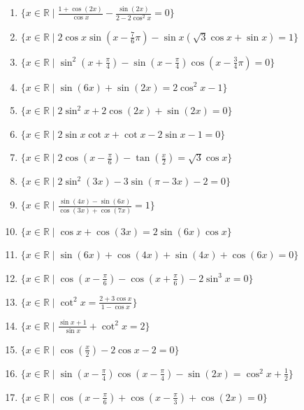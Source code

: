 \documentclass[11pt,a4paper]{article}
\begin{document}
\begin{enumerate}
\item $\displaystyle \{x \in \mathbb{R} \mid \frac{1 + \cos\left(2x\right)}{\cos x} - \frac{\sin\left(2x\right)}{2 - 2\cos^{2} x} = 0\}$
\item $\displaystyle \{x \in \mathbb{R} \mid 2\cos x \sin\left(x - \frac{7}{6}\pi\right) - \sin x(\sqrt{3}\cos x + \sin x) = 1\}$
\item $\displaystyle \{x \in \mathbb{R} \mid \sin^{2}\left(x + \frac{\pi}{4}\right) - \sin\left(x - \frac{\pi}{4}\right)\cos\left(x - \frac{3}{4}\pi\right) = 0\}$
\item $\displaystyle \{x \in \mathbb{R} \mid \sin\left(6x\right) + \sin\left(2x\right) = 2\cos^{2} x - 1\}$
\item $\displaystyle \{x \in \mathbb{R} \mid 2\sin^{2} x + 2\cos\left(2x\right) + \sin\left(2x\right) = 0\}$
\item $\displaystyle \{x \in \mathbb{R} \mid 2\sin x \cot x + \cot x - 2\sin x - 1 = 0\}$
\item $\displaystyle \{x \in \mathbb{R} \mid 2\cos\left(x - \frac{\pi}{6}\right) - \tan\left(\frac{x}{2}\right) = \sqrt{3}\cos x\}$
\item $\displaystyle \{x \in \mathbb{R} \mid 2\sin^{2}\left(3x\right) - 3\sin\left(\pi - 3x\right) - 2 = 0\}$
\item $\displaystyle \{x \in \mathbb{R} \mid \frac{\sin\left(4x\right) - \sin\left(6x\right)}{\cos\left(3x\right) + \cos\left(7x\right)} = 1\}$
\item $\displaystyle \{x \in \mathbb{R} \mid \cos x + \cos\left(3x\right) = 2\sin\left(6x\right)\cos x\}$
\item $\displaystyle \{x \in \mathbb{R} \mid \sin\left(6x\right) + \cos\left(4x\right) + \sin\left(4x\right) + \cos\left(6x\right) = 0\}$
\item $\displaystyle \{x \in \mathbb{R} \mid \cos\left(x - \frac{\pi}{6}\right) - \cos\left(x + \frac{\pi}{6}\right) - 2\sin^{3} x = 0\}$
\item $\displaystyle \{x \in \mathbb{R} \mid \cot^{2} x = \frac{2 + 3\cos x}{1 - \cos x}\}$
\item $\displaystyle \{x \in \mathbb{R} \mid \frac{\sin x + 1}{\sin x} + \cot^{2} x = 2\}$
\item $\displaystyle \{x \in \mathbb{R} \mid \cos\left(\frac{x}{2}\right) - 2\cos x - 2 = 0\}$
\item $\displaystyle \{x \in \mathbb{R} \mid \sin\left(x - \frac{\pi}{4}\right)\cos\left(x - \frac{\pi}{4}\right) - \sin\left(2x\right) = \cos^{2} x + \frac{1}{2}\}$
\item $\displaystyle \{x \in \mathbb{R} \mid \cos\left(x - \frac{\pi}{6}\right) + \cos\left(x - \frac{\pi}{3}\right) + \cos\left(2x\right) = 0\}$

\end{enumerate}
\end{document}
